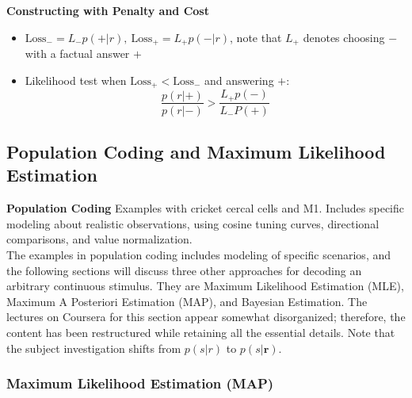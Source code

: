 \documentclass[11pt]{article}
\begin{document}
\noindent \textbf{Constructing with Penalty and Cost} 
\begin{itemize}
    \item $\text{Loss}_-=L_-p(+|r), \ \text{Loss}_+=L_+p(-|r)$, note that $L_+$ denotes choosing $-$ with a factual answer $+$
    \item Likelihood test when $\text{Loss}_+<\text{Loss}_-$ and answering $+$:
    \begin{equation*}
        \frac{p(r|+)}{p(r|-)}>\frac{L_+p(-)}{L_-P(+)}
    \end{equation*}
\end{itemize}
\subsection{Population Coding and Maximum Likelihood Estimation}
\noindent \textbf{Population Coding} Examples with cricket cercal cells and M1. Includes specific modeling about realistic observations, using cosine tuning curves, directional comparisons, and value normalization. 
\\

The examples in population coding includes modeling of specific scenarios, and the following sections will discuss three other approaches for decoding an arbitrary continuous stimulus. They are Maximum Likelihood Estimation (MLE), Maximum A Posteriori Estimation (MAP), and Bayesian Estimation. The lectures on Coursera for this section appear somewhat disorganized; therefore, the content has been restructured while retaining all the essential details. Note that the subject investigation shifts from $p(s|r)$ to $p(s|\mathbf{r})$.

\subsubsection{Maximum Likelihood Estimation (MAP)}
\end{document}
